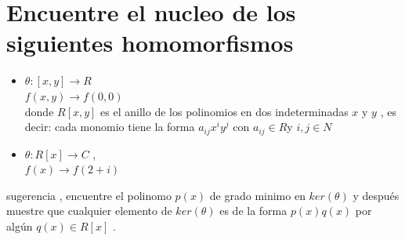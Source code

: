 \documentclass[10pt,a4paper]{article} %
\begin{document}
    \section{Encuentre el nucleo de los siguientes homomorfismos}
    \begin{itemize}
        \item {        $ \theta :[x,y] \to R  $
    \\ $ f(x,y) \to f(0,0)  $
    \\ donde $ R[x,y]  $ es el anillo de los polinomios en dos indeterminadas $
    x  $ y $ y  $ , es decir: cada monomio  tiene la forma $ a_{ij}x ^{i} y
    ^{j}   $ con $ a_{ij} \in R $y $ i,j \in N  $}
    \item {$ \theta : R[x] \to C  $ ,
        \\ $ f(x) \to f(2+i)  $  }
    \end{itemize}

    sugerencia ,  encuentre el polinomo $ p(x)  $ de grado minimo en $
    ker(\theta )  $ y después muestre que cualquier elemento de $ ker(\theta )
    $ es de la forma $ p(x)q(x)  $   por algún $ q(x) \in R[x]  $ .










    \nocite{*}
    
    
\end{document}
